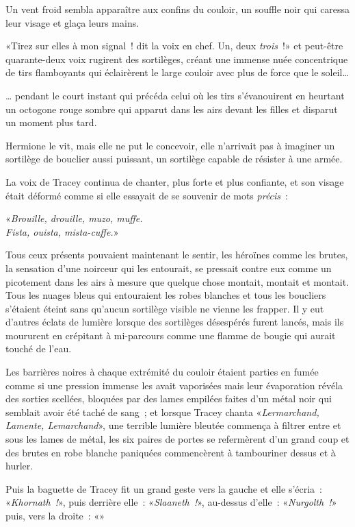 Un vent froid sembla apparaître aux confins du couloir, un souffle noir qui caressa leur visage et glaça leurs mains.

«Tirez sur elles à mon signal~! dit la voix en chef. Un, deux \emph{trois}~!» et peut-être quarante-deux voix rugirent des sortilèges, créant une immense nuée concentrique de tirs flamboyants qui éclairèrent le large couloir avec plus de force que le soleil…

… pendant le court instant qui précéda celui où les tirs s'évanouirent en heurtant un octogone rouge sombre qui apparut dans les airs devant les filles et disparut un moment plus tard.

Hermione le vit, mais elle ne put le concevoir, elle n'arrivait pas à imaginer un sortilège de bouclier aussi puissant, un sortilège capable de résister à une armée.

La voix de Tracey continua de chanter, plus forte et plus confiante, et son visage était déformé comme si elle essayait de se souvenir de mots \emph{précis}~:

«\emph{Brouille, drouille, muzo, muffe.\\
Fista, ouista, mista-cuffe.}»

Tous ceux présents pouvaient maintenant le sentir, les héroïnes comme les brutes, la sensation d'une noirceur qui les entourait, se pressait contre eux comme un picotement dans les airs à mesure que quelque chose montait, montait et montait. Tous les nuages bleus qui entouraient les robes blanches et tous les boucliers s'étaient éteint sans qu'aucun sortilège visible ne vienne les frapper. Il y eut d'autres éclats de lumière lorsque des sortilèges désespérés furent lancés, mais ils moururent en crépitant à mi-parcours comme une flamme de bougie qui aurait touché de l'eau.

Les barrières noires à chaque extrémité du couloir étaient parties en fumée comme si une pression immense les avait vaporisées mais leur évaporation révéla des sorties scellées, bloquées par des lames empilées faites d'un métal noir qui semblait avoir été taché de sang~; et lorsque Tracey chanta «\emph{Lermarchand, Lamente, Lemarchand}», une terrible lumière bleutée commença à filtrer entre et sous les lames de métal, les six paires de portes se refermèrent d'un grand coup et des brutes en robe blanche paniquées commencèrent à tambouriner dessus et à hurler.

Puis la baguette de Tracey fit un grand geste vers la gauche et elle s'écria~: «\emph{Khornath~!}», puis derrière elle~: «\emph{Slaaneth~!}», au-dessus d'elle~: «\emph{Nurgolth~!}» puis, vers la droite~: «»

